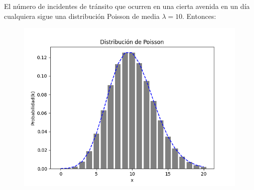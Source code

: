 El número de incidentes de tránsito que ocurren en una cierta avenida en un día
cualquiera sigue una distribución Poisson de media $\lambda=10$. Entonces:

\begin{figure}
    \centering
  \includegraphics[scale=0.9]{../slides/figures/poisson_distribution_lambda_10.png}
\end{figure}


